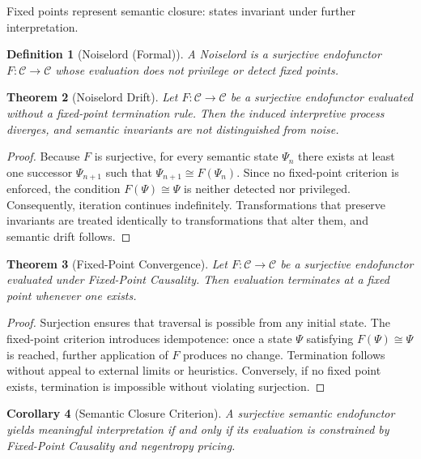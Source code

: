 \documentclass[12pt]{article}
\newtheorem{theorem}{Theorem}[section]
\newtheorem{corollary}[theorem]{Corollary}
\newtheorem{definition}[theorem]{Definition}
\theoremstyle{remark}
\begin{document}
Fixed points represent semantic closure: states invariant under further interpretation.

\begin{definition}[Noiselord (Formal)]
A Noiselord is a surjective endofunctor $F : \mathcal{C} \to \mathcal{C}$ whose evaluation does not privilege or detect fixed points.
\end{definition}

\begin{theorem}[Noiselord Drift]
\label{thm:noiselord_drift}
Let $F : \mathcal{C} \to \mathcal{C}$ be a surjective endofunctor evaluated without a fixed-point termination rule. Then the induced interpretive process diverges, and semantic invariants are not distinguished from noise.
\end{theorem}

\begin{proof}
Because $F$ is surjective, for every semantic state $\Psi_n$ there exists at least one successor $\Psi_{n+1}$ such that $\Psi_{n+1} \cong F(\Psi_n)$. Since no fixed-point criterion is enforced, the condition $F(\Psi) \cong \Psi$ is neither detected nor privileged. Consequently, iteration continues indefinitely. Transformations that preserve invariants are treated identically to transformations that alter them, and semantic drift follows.
\end{proof}

\begin{theorem}[Fixed-Point Convergence]
\label{thm:fpc}
Let $F : \mathcal{C} \to \mathcal{C}$ be a surjective endofunctor evaluated under Fixed-Point Causality. Then evaluation terminates at a fixed point whenever one exists.
\end{theorem}

\begin{proof}
Surjection ensures that traversal is possible from any initial state. The fixed-point criterion introduces idempotence: once a state $\Psi$ satisfying $F(\Psi) \cong \Psi$ is reached, further application of $F$ produces no change. Termination follows without appeal to external limits or heuristics. Conversely, if no fixed point exists, termination is impossible without violating surjection.
\end{proof}

\begin{corollary}[Semantic Closure Criterion]
A surjective semantic endofunctor yields meaningful interpretation if and only if its evaluation is constrained by Fixed-Point Causality and negentropy pricing.
\end{corollary}
\end{document}
